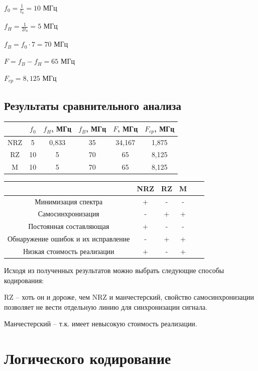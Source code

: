 $f_0 = \frac{1}{t_b} = 10$ МГц

$f_H = \frac{1}{2t_b} = 5$ МГц

$f_B = f_0 \cdot 7 = 70$ МГц

$F = f_B - f_H = 65$ МГц

$F_{cp} = 8,125$ МГц
\subsection{Результаты сравнительного анализа}
\begin{table}[!h]
\begin{tabular}{|c|c|c|c|c|c|}
\hline
    & $f_0$ & $f_H$, МГц & $f_B$, МГц & $F$, МГц & $F_{cp}$, МГц \\ \hline
NRZ & 5     & 0,833      & 35         & 34,167   & 1,875         \\ \hline
RZ  & 10    & 5          & 70         & 65       & 8,125         \\ \hline
M   & 10    & 5          & 70         & 65       & 8,125         \\ \hline
\end{tabular}
\end{table}

\begin{table}[!h]
\begin{tabular}{|c|c|c|c|c|c|}
\hline
                                    & NRZ & RZ & M \\ \hline
Минимизация спектра                 & +   & -  & - \\ \hline
Самосинхронизация                   & -   & +  & + \\ \hline
Постоянная составляющая             & +   & -  & - \\ \hline
Обнаружение ошибок и их исправление & -   & +  & + \\ \hline
Низкая стоимость реализации         & +   & -  & + \\ \hline
\end{tabular}
\end{table}

Исходя из полученных результатов можно выбрать следующие способы кодирования:

RZ -- хоть он и дороже, чем NRZ и манчестерский, свойство самосинхронизации
позволяет не вести отдельную линию для синхронизации сигнала.

Манчестерский -- т.к. имеет невысокую стоимость реализации.

\section{Логического кодирование}
